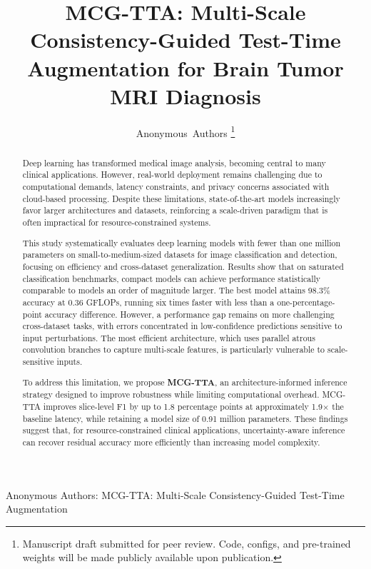 ﻿\documentclass[journal]{IEEEtran}
\begin{document}
\title{MCG-TTA: Multi-Scale Consistency-Guided Test-Time Augmentation for Brain Tumor MRI Diagnosis}

\author{Anonymous~Authors%
\thanks{Manuscript draft submitted for peer review. Code, configs, and pre-trained weights will be made publicly available upon publication.}}

%
{Anonymous Authors: MCG-TTA: Multi-Scale Consistency-Guided Test-Time Augmentation}

\maketitle
\begin{abstract}
Deep learning has transformed medical image analysis, becoming central to many clinical applications. However, real-world deployment remains challenging due to computational demands, latency constraints, and privacy concerns associated with cloud-based processing. Despite these limitations, state-of-the-art models increasingly favor larger architectures and datasets, reinforcing a scale-driven paradigm that is often impractical for resource-constrained systems.

This study systematically evaluates deep learning models with fewer than one million parameters on small-to-medium-sized datasets for image classification and detection, focusing on efficiency and cross-dataset generalization. Results show that on saturated classification benchmarks, compact models can achieve performance statistically comparable to models an order of magnitude larger. The best model attains 98.3\% accuracy at 0.36 GFLOPs, running six times faster with less than a one-percentage-point accuracy difference. However, a performance gap remains on more challenging cross-dataset tasks, with errors concentrated in low-confidence predictions sensitive to input perturbations. The most efficient architecture, which uses parallel atrous convolution branches to capture multi-scale features, is particularly vulnerable to scale-sensitive inputs.

To address this limitation, we propose \textbf{MCG-TTA}, an architecture-informed inference strategy designed to improve robustness while limiting computational overhead. MCG-TTA improves slice-level F1 by up to 1.8 percentage points at approximately 1.9$\times$ the baseline latency, while retaining a model size of 0.91 million parameters. These findings suggest that, for resource-constrained clinical applications, uncertainty-aware inference can recover residual accuracy more efficiently than increasing model complexity.
\end{abstract}
\end{document}
